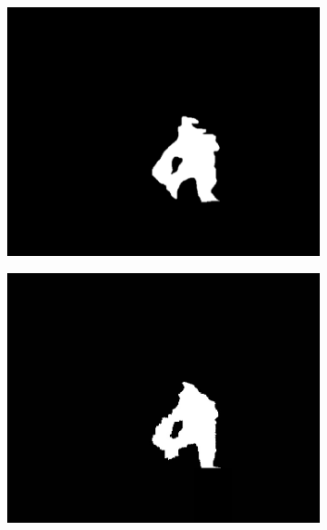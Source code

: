 \documentclass[14pt, a4paper]{extreport}
\begin{document}
		
	\begin{figure}[h!]
		\begin{subfigure}{.32\textwidth}
			\centering
			\includegraphics[width = \textwidth]{image/chapter_3/examples/mask_razmet/206}
		\end{subfigure}
		\begin{subfigure}{.32\textwidth}
			\centering
			\includegraphics[width = \textwidth]{image/chapter_3/examples/mask/206}
		\end{subfigure}
		\begin{subfigure}{.32\textwidth}
			\centering

\end{subfigure}
\end{figure}
\end{document}
